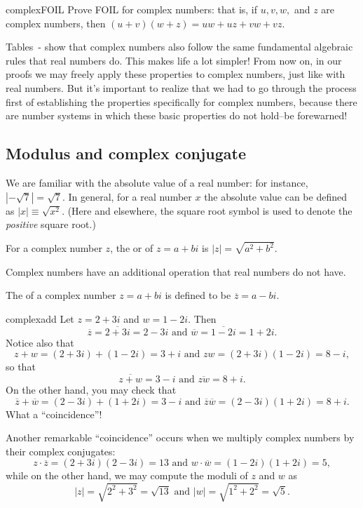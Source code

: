 \begin{exercise}{complexFOIL}
Prove FOIL for complex numbers: that is, if $u,v,w,$ and $z$ are complex numbers, then $(u+v)(w+z) = uw + uz+vw+vz$.
\end{exercise}

Tables~\label{additive_table}-\label{multiplicative_table} show that complex numbers also follow the same fundamental algebraic  rules that real numbers do. This makes life a lot simpler! From now on,
in our proofs we may freely apply these properties to complex numbers, just like with real numbers. But it's important to realize that we had to go through the process first of establishing the properties specifically for complex numbers, because there are number systems in which these basic properties do not hold--be forewarned! 

\subsection{Modulus and complex conjugate}

We are familiar with the absolute value of a real number: for instance,
$|-\sqrt{7}|=\sqrt{7}$. In general, for a real number $x$ the absolute
value can be defined as $|x|\equiv\sqrt{x^{2}}$. (Here and elsewhere, the square root symbol is used to denote the \emph{positive} square root.)

\begin{defn}
For a complex number $z$, the  or 
of $z=a+bi$ is $|z|=\sqrt{a^{2}+b^{2}}$.
\end{defn}

Complex numbers have an additional operation that real numbers do
not have. 

\begin{defn}
The 
of a complex number $z=a+bi$ is defined to be $\overline{z}=a-bi$.
\end{defn}

\begin{example}{complexadd} Let $z=2+3i$ and $w=1-2i$. Then 
\[ \overline{z} = \overline{2+3i} = 2 - 3i \text{   and   } \overline{w} = \overline{1 - 2i} = 1 + 2i.\]
Notice also that 
\[ z+w=(2+3i)+(1-2i)=3+i \text{  and  } zw=(2+3i)(1-2i)=8-i,\]
so that 
\[ \overline{z+w}=3-i \text{  and  } \overline{zw}=8+i.\]
On the other hand, you may check  that 
\[ \overline{z}+\overline{w}=(2-3i)+(1+2i)=3-i \text{  and  } \overline{z}\overline{w}=(2-3i)(1+2i)=8+i.\]
What a ``coincidence''!

Another remarkable ``coincidence'' occurs when we multiply complex numbers by their complex conjugates:
\[ z \cdot \overline{z} = (2+3i)(2-3i) = 13 \text{  and  }  w \cdot \overline{w} = (1-2i)(1+2i) = 5, \]
while on the other hand, we may compute the moduli of $z$ and $w$ as
\[ |z| = \sqrt{2^2 + 3^2} = \sqrt{13} \text{  and  } |w| = \sqrt{ 1^2 + 2^2} =\sqrt{5}. \]
 \end{example}
 \medskip

